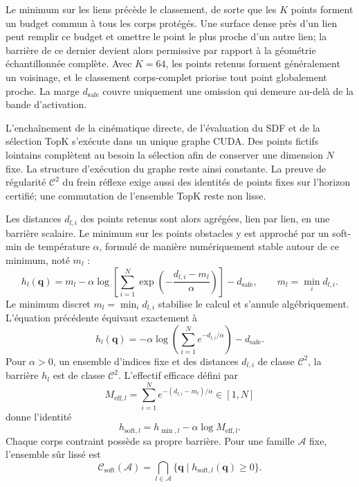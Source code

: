 Le minimum sur les liens précède le classement, de sorte que les $K$ points forment un budget commun à tous les corps protégés. Une surface dense près d'un lien peut remplir ce budget et omettre le point le plus proche d'un autre lien; la barrière de ce dernier devient alors permissive par rapport à la géométrie échantillonnée complète. Avec $K=64$, les points retenus forment généralement un voisinage, et le classement corps-complet priorise tout point globalement proche. La marge $d_{\mathrm{safe}}$ couvre uniquement une omission qui demeure au-delà de la bande d'activation.

L'enchaînement de la cinématique directe, de l'évaluation du \ac{SDF} et de la sélection TopK s'exécute dans un unique graphe \ac{CUDA}. Des points fictifs lointains complètent au besoin la sélection afin de conserver une dimension $N$ fixe. La structure d'exécution du graphe reste ainsi constante. La preuve de régularité $\mathcal{C}^2$ du frein réflexe exige aussi des identités de points fixes sur l'horizon certifié; une commutation de l'ensemble TopK reste non lisse.

Les distances $d_{l,i}$ des points retenus sont alors agrégées, lien par lien, en une barrière scalaire. Le minimum sur les points obstacles y est approché par un soft-min de température $\alpha$, formulé de manière numériquement stable autour de ce minimum, noté $m_l$ :
\begin{equation}
h_l(\mathbf{q}) = m_l -\alpha\log\!\left[ \sum_{i=1}^{N} \exp\!\left( -\frac{d_{l,i}-m_l}{\alpha} \right) \right] -d_{\mathrm{safe}},
\qquad m_l = \min_i d_{l,i}.
\end{equation}
Le minimum discret $m_l=\min_i d_{l,i}$ stabilise le calcul et s'annule algébriquement. L'équation précédente équivaut exactement à
\begin{equation}
h_l(\mathbf{q})=-\alpha\log\!\left(\sum_{i=1}^N e^{-d_{l,i}/\alpha}\right)-d_{\mathrm{safe}}.
\end{equation}
Pour $\alpha>0$, un ensemble d'indices fixe et des distances $d_{l,i}$ de classe $\mathcal{C}^2$, la barrière $h_l$ est de classe $\mathcal{C}^2$. L'effectif efficace défini par
\begin{equation}
M_{\mathrm{eff},l}=\sum_{i=1}^N e^{-(d_{l,i}-m_l)/\alpha}\in[1,N]
\end{equation}
donne l'identité
\begin{equation}\label{eq:softmin_bias}
h_{\mathrm{soft},l}=h_{\min,l}-\alpha\log M_{\mathrm{eff},l}.
\end{equation}
Chaque corps contraint possède sa propre barrière. Pour une famille $\mathcal{A}$ fixe, l'ensemble sûr lissé est
\begin{equation}
\mathcal{C}_{\mathrm{soft}}(\mathcal{A})
=\bigcap_{l\in\mathcal{A}}\{\mathbf{q}\mid h_{\mathrm{soft},l}(\mathbf{q})\geq 0\}.
\end{equation}

